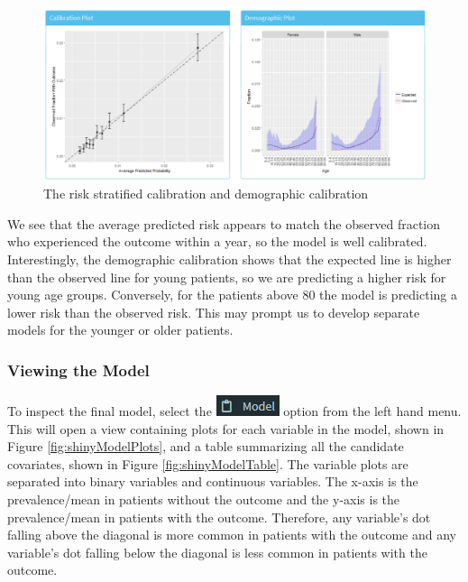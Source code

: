 \documentclass[11pt]{book}
\theoremstyle{definition}
\theoremstyle{definition}
\theoremstyle{definition}
\theoremstyle{remark}
\begin{document}
\begin{figure}

{\centering \includegraphics[width=1\linewidth]{images/PatientLevelPrediction/shiny/shinyPerformanceCal} 

}

\caption{The risk stratified calibration and demographic calibration}\label{fig:shinyPerformanceCal}
\end{figure}

We see that the average predicted risk appears to match the observed
fraction who experienced the outcome within a year, so the model is well
calibrated. Interestingly, the demographic calibration shows that the
expected line is higher than the observed line for young patients, so we
are predicting a higher risk for young age groups. Conversely, for the
patients above 80 the model is predicting a lower risk than the observed
risk. This may prompt us to develop separate models for the younger or
older patients.

\subsubsection*{Viewing the Model}\label{viewing-the-model}

To inspect the final model, select the
\includegraphics{images/PatientLevelPrediction/modelButton.png} option
from the left hand menu. This will open a view containing plots for each
variable in the model, shown in Figure \ref{fig:shinyModelPlots}, and a
table summarizing all the candidate covariates, shown in Figure
\ref{fig:shinyModelTable}. The variable plots are separated into binary
variables and continuous variables. The x-axis is the prevalence/mean in
patients without the outcome and the y-axis is the prevalence/mean in
patients with the outcome. Therefore, any variable's dot falling above
the diagonal is more common in patients with the outcome and any
variable's dot falling below the diagonal is less common in patients
with the outcome.
\end{document}
